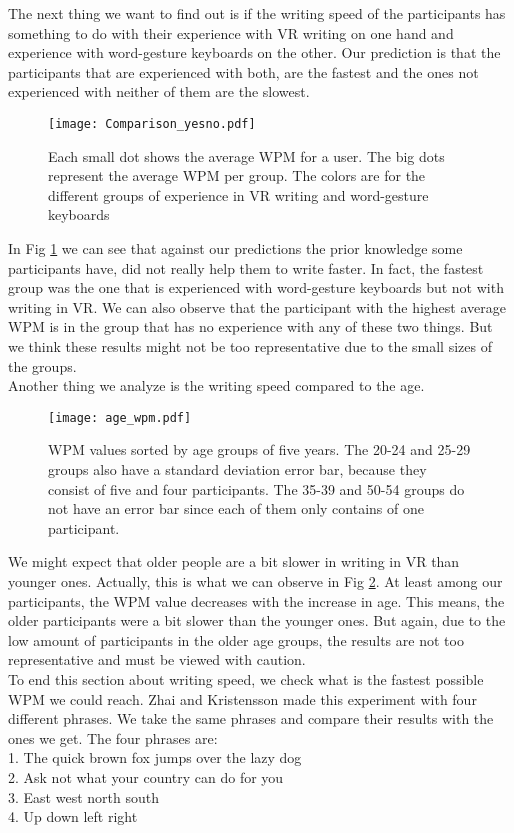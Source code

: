 The next thing we want to find out is if the writing speed of the participants has something to do with their experience with VR writing on one hand and experience with word-gesture keyboards on the other. Our prediction is that the participants that are experienced with both, are the fastest and the ones not experienced with neither of them are the slowest.\\
\begin{figure}[H]
    \centering
    \texttt{[image: Comparison\_yesno.pdf]}
    \caption{Each small dot shows the average WPM for a user. The big dots represent the average WPM per group. The colors are for the different groups of experience in VR writing and word-gesture keyboards}
    \label{fig:WPM_yesno}
\end{figure}
In Fig \ref{fig:WPM_yesno} we can see that against our predictions the prior knowledge some participants have, did not really help them to write faster. In fact, the fastest group was the one that is experienced with word-gesture keyboards but not with writing in VR. We can also observe that the participant with the highest average WPM is in the group that has no experience with any of these two things. But we think these results might not be too representative due to the small sizes of the groups.\\

Another thing we analyze is the writing speed compared to the age.
\begin{figure}[H]
    \centering
    \texttt{[image: age\_wpm.pdf]}
    \caption{WPM values sorted by age groups of five years. The 20-24 and 25-29 groups also have a standard deviation error bar, because they consist of five and four participants. The 35-39 and 50-54 groups do not have an error bar since each of them only contains of one participant.}
    \label{fig:WPM_age}
\end{figure}

We might expect that older people are a bit slower in writing in VR than younger ones. Actually, this is what we can observe in Fig \ref{fig:WPM_age}. At least among our participants, the WPM value decreases with the increase in age. This means, the older participants were a bit slower than the younger ones. But again, due to the low amount of participants in the older age groups, the results are not too representative and must be viewed with caution.\\

To end this section about writing speed, we check what is the fastest possible WPM we could reach. Zhai and Kristensson \cite{Kristensson2004SHARK2AL} made this experiment with four different phrases. We take the same phrases and compare their results with the ones we get. The four phrases are:\\
1. The quick brown fox jumps over the lazy dog\\
2. Ask not what your country can do for you\\
3. East west north south\\
4. Up down left right\\

